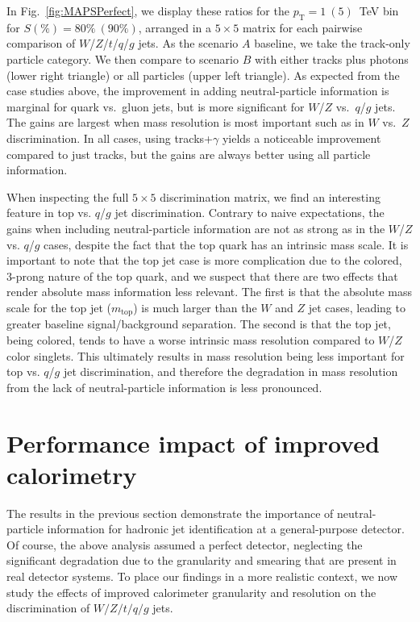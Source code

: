 \documentclass[11pt,letterpaper]{article}
\DeclareRobustCommand{\Fig}[1]{Fig.~\ref{#1}}
\newcommand{\pt}{p_{\mathrm{T}}}
\begin{document}
In \Fig{fig:MAPSPerfect}, we display these ratios for the $\pt=1~(5)$~TeV bin for $S(\%)=80\%~(90\%)$, arranged in a $5 \times 5$ matrix for each pairwise comparison of $W$/$Z$/$t$/$q$/$g$ jets.
%
As the scenario $A$ baseline, we take the track-only particle category.
%
We then compare to scenario $B$ with either tracks plus photons (lower right triangle) or all particles (upper left triangle).
%
As expected from the case studies above, the improvement in adding neutral-particle information is marginal for quark vs.\ gluon jets, but is more significant for $W$/$Z$ vs.\ $q$/$g$ jets.
%
The gains are largest when mass resolution is most important such as in $W$ vs.~$Z$ discrimination.  
%
In all cases, using tracks+$\gamma$ yields a noticeable improvement compared to just tracks, but the gains are always better using all particle information.

When inspecting the full $5 \times 5$ discrimination matrix, we find an interesting feature in top vs. $q$/$g$ jet discrimination.
%
Contrary to naive expectations, the gains when including neutral-particle information are not as strong as in the $W$/$Z$ vs. $q$/$g$ cases, despite the fact that the top quark has an intrinsic mass scale.
%  
It is important to note that the top jet case is more complication due to the colored, 3-prong nature of the top quark, and we suspect that there are two effects that render absolute mass information less relevant.
%
The first is that the absolute mass scale for the top jet ($m_\text{top}$) is much larger than the $W$ and $Z$ jet cases, leading to greater baseline signal/background separation.  
%
The second is that the top jet, being colored, tends to have a worse intrinsic mass resolution compared to $W$/$Z$ color singlets.
%
This ultimately results in mass resolution being less important for top vs. $q$/$g$ jet discrimination, and therefore the degradation in mass resolution from the lack of neutral-particle information is less pronounced.


\section{Performance impact of improved calorimetry}
\label{sec:ImprovedDetector}

The results in the previous section demonstrate the importance of neutral-particle information for hadronic jet identification at a general-purpose detector.
% 
Of course, the above analysis assumed a perfect detector, neglecting the significant degradation due to the granularity and smearing that are present in real detector systems.
%
To place our findings in a more realistic context, we now study the effects of improved calorimeter granularity and resolution on the discrimination of $W/Z/t/q/g$ jets. 
\end{document}
